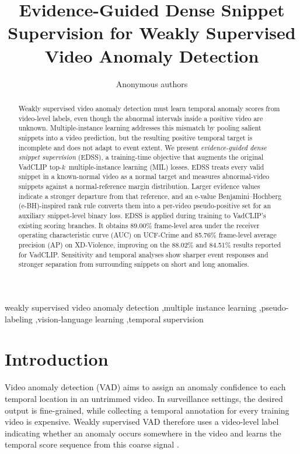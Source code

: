 \documentclass[preprint,12pt]{elsarticle}
\newcommand{\topk}{top-$k$\ }
\begin{document}
\begin{frontmatter}

\title{Evidence-Guided Dense Snippet Supervision for Weakly Supervised Video Anomaly Detection}

\author{Anonymous authors}

\begin{abstract}
Weakly supervised video anomaly detection must learn temporal anomaly scores from video-level labels, even though the abnormal intervals inside a positive video are unknown. Multiple-instance learning addresses this mismatch by pooling salient snippets into a video prediction, but the resulting positive temporal target is incomplete and does not adapt to event extent. We present \emph{evidence-guided dense snippet supervision} (EDSS), a training-time objective that augments the original VadCLIP \topk multiple-instance learning (MIL) losses. EDSS treats every valid snippet in a known-normal video as a normal target and measures abnormal-video snippets against a normal-reference margin distribution. Larger evidence values indicate a stronger departure from that reference, and an e-value Benjamini--Hochberg (e-BH)-inspired rank rule converts them into a per-video pseudo-positive set for an auxiliary snippet-level binary loss. EDSS is applied during training to VadCLIP's existing scoring branches. It obtains 89.00\% frame-level area under the receiver operating characteristic curve (AUC) on UCF-Crime and 85.76\% frame-level average precision (AP) on XD-Violence, improving on the 88.02\% and 84.51\% results reported for VadCLIP. Sensitivity and temporal analyses show sharper event responses and stronger separation from surrounding snippets on short and long anomalies.
\end{abstract}

\begin{keyword}
weakly supervised video anomaly detection \sep multiple instance learning \sep pseudo-labeling \sep vision-language learning \sep temporal supervision
\end{keyword}

\end{frontmatter}

\section{Introduction}
\label{sec:introduction}

Video anomaly detection (VAD) aims to assign an anomaly confidence to each temporal location in an untrimmed video. In surveillance settings, the desired output is fine-grained, while collecting a temporal annotation for every training video is expensive. Weakly supervised VAD therefore uses a video-level label indicating whether an anomaly occurs somewhere in the video and learns the temporal score sequence from this coarse signal \citep{sultani2018,rtfm2021,mist2021}.
\end{document}
